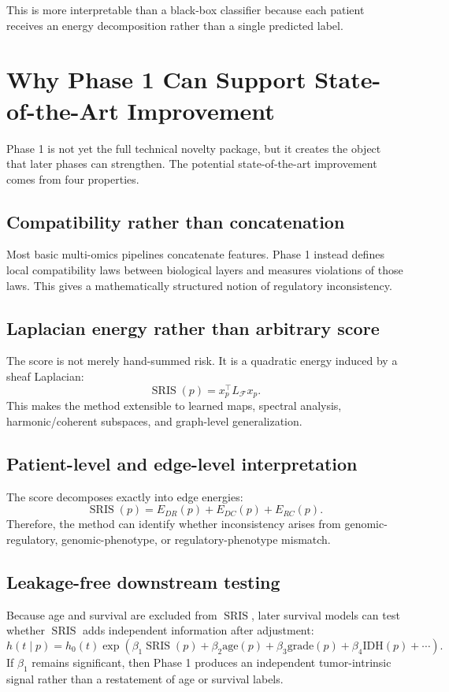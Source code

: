 \documentclass[11pt]{article}
\newcommand{\LF}{L_{\mathcal{F}}}
\newcommand{\SRIS}{\operatorname{SRIS}}
\begin{document}
This is more interpretable than a black-box classifier because each patient receives an energy decomposition rather than a single predicted label.

\section{Why Phase 1 Can Support State-of-the-Art Improvement}

Phase 1 is not yet the full technical novelty package, but it creates the object that later phases can strengthen.  The potential state-of-the-art improvement comes from four properties.

\subsection{Compatibility rather than concatenation}

Most basic multi-omics pipelines concatenate features.  Phase 1 instead defines local compatibility laws between biological layers and measures violations of those laws.  This gives a mathematically structured notion of regulatory inconsistency.

\subsection{Laplacian energy rather than arbitrary score}

The score is not merely hand-summed risk.  It is a quadratic energy induced by a sheaf Laplacian:
\[
\SRIS(p)=x_p^\top\LF x_p.
\]
This makes the method extensible to learned maps, spectral analysis, harmonic/coherent subspaces, and graph-level generalization.

\subsection{Patient-level and edge-level interpretation}

The score decomposes exactly into edge energies:
\[
\SRIS(p)=E_{DR}(p)+E_{DC}(p)+E_{RC}(p).
\]
Therefore, the method can identify whether inconsistency arises from genomic-regulatory, genomic-phenotype, or regulatory-phenotype mismatch.

\subsection{Leakage-free downstream testing}

Because age and survival are excluded from $\SRIS$, later survival models can test whether $\SRIS$ adds independent information after adjustment:
\[
h(t\mid p)=h_0(t)\exp\left(\beta_1\SRIS(p)+\beta_2\text{age}(p)+\beta_3\text{grade}(p)+\beta_4\text{IDH}(p)+\cdots\right).
\]
If $\beta_1$ remains significant, then Phase 1 produces an independent tumor-intrinsic signal rather than a restatement of age or survival labels.
\end{document}
